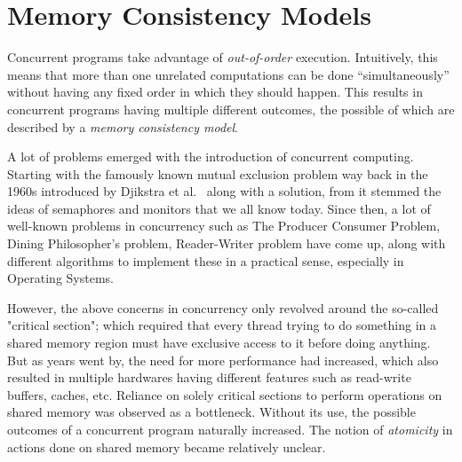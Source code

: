 \section{Memory Consistency Models}

Concurrent programs take advantage of \textit{out-of-order} execution. 
Intuitively, this means that more than one unrelated computations can be done ``simultaneously'' without having any fixed order in which they should happen.
This results in concurrent programs having multiple different outcomes, the possible of which are described by a \textit{memory consistency model}. 

A lot of problems emerged with the introduction of concurrent computing. 
Starting with the famously known mutual exclusion problem way back in the 1960s introduced by Djikstra et al.~\cite{Djikstra} along with a solution, from it stemmed the ideas of semaphores and monitors that we all know today.  
Since then, a lot of well-known problems in concurrency such as The Producer Consumer Problem, Dining Philosopher's problem, Reader-Writer problem have come up, along with different algorithms to implement these in a practical sense, especially in Operating Systems. 

However, the above concerns in concurrency only revolved around the so-called "critical section"; which required that every thread trying to do something in a shared memory region must have exclusive access to it before doing anything. 
But as years went by, the need for more performance had increased, which also resulted in multiple hardwares having different features such as read-write buffers, caches, etc. 
Reliance on solely critical sections to perform operations on shared memory was observed as a bottleneck. 
Without its use, the possible outcomes of a concurrent program naturally increased.
The notion of \textit{atomicity} in actions done on shared memory became relatively unclear.  

